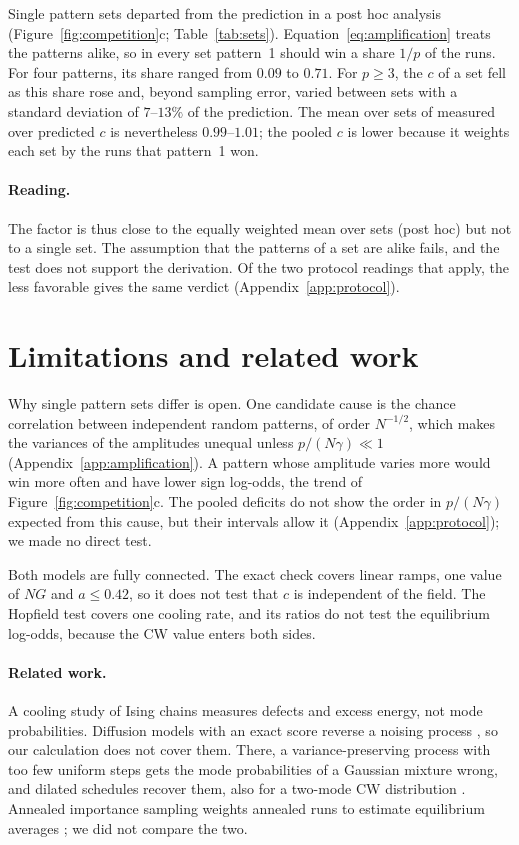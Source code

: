 \documentclass[final]{dynafront2026}
\begin{document}
Single pattern sets departed from the prediction in a post hoc analysis
(Figure~\ref{fig:competition}c; Table~\ref{tab:sets}).
Equation~\eqref{eq:amplification} treats the patterns alike, so in every set
pattern~1 should win a share $1/p$ of the runs. For four patterns, its share
ranged from $0.09$ to $0.71$. For $p\ge3$, the $c$ of a set fell as this
share rose and, beyond sampling error, varied between sets with a standard
deviation of $7$--$13\%$ of the prediction. The mean over sets of measured
over predicted $c$ is nevertheless $0.99$--$1.01$; the pooled $c$ is lower
because it weights each set by the runs that pattern~1 won.

\paragraph{Reading.}
The factor is thus close to the equally weighted mean over sets (post hoc)
but not to a single set. The assumption that the patterns of a set are alike
fails, and the test does not support the derivation. Of the two protocol
readings that apply, the less favorable gives the same verdict
(Appendix~\ref{app:protocol}).

\section{Limitations and related work}
\label{sec:limits}

Why single pattern sets differ is open. One candidate cause is the chance
correlation between independent random patterns, of order $N^{-1/2}$, which
makes the variances of the amplitudes unequal unless $p/(N\gamma)\ll1$
(Appendix~\ref{app:amplification}). A pattern whose amplitude varies more
would win more often and have lower sign log-odds, the trend of
Figure~\ref{fig:competition}c. The pooled deficits do not show the order in $p/(N\gamma)$ expected from
this cause, but their intervals allow it (Appendix~\ref{app:protocol}); we
made no direct test.

Both models are fully connected. The exact check covers linear ramps, one value of $NG$ and $a\le0.42$, so it
does not test that $c$ is independent of the field. The Hopfield test covers
one cooling rate, and its ratios do not test the equilibrium log-odds,
because the CW value enters both sides.

\paragraph{Related work.}
\label{sec:discussion}%
A cooling study of Ising chains \citep{suzuki2009} measures defects and
excess energy, not mode probabilities. Diffusion models with an exact score
reverse a noising process \citep{biroli2024}, so our calculation does not
cover them. There, a
variance-preserving process with too few uniform steps gets the mode
probabilities of a Gaussian mixture wrong, and dilated schedules recover
them, also for a two-mode CW distribution \citep{aranguri2025}. Annealed
importance sampling weights annealed runs to estimate equilibrium averages
\citep{neal2001}; we did not compare the two.
\end{document}
